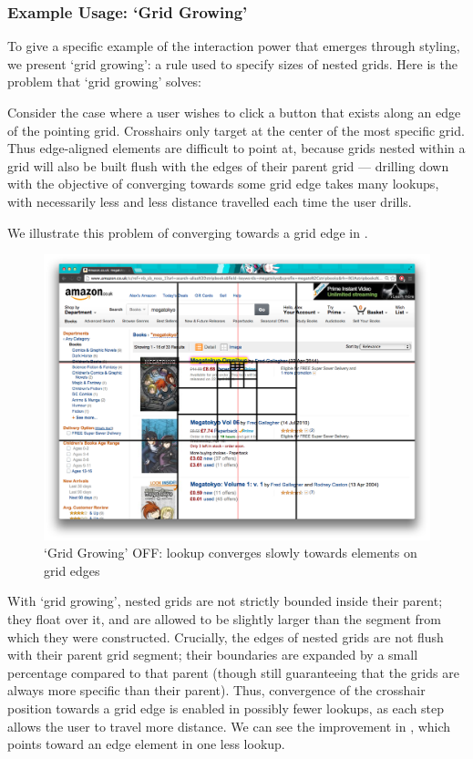 \documentclass[11pt,openright,a4paper]{report}
\begin{document}
\subsubsection{Example Usage: `Grid Growing'}
To give a specific example of the interaction power that emerges through styling, we present `grid growing': a rule used to specify sizes of nested grids. Here is the problem that `grid growing' solves:

Consider the case where a user wishes to click a button that exists along an edge of the pointing grid. Crosshairs only target at the center of the most specific grid. Thus edge-aligned elements are difficult to point at, because grids nested within a grid will also be built flush with the edges of their parent grid --- drilling down with the objective of converging towards some grid edge takes many lookups, with necessarily less and less distance travelled each time the user drills.

We illustrate this problem of converging towards a grid edge in .

\begin{figure}[ht]
\centering\includegraphics[width=\textwidth]{figures/GrowingOff.png}
\caption{`Grid Growing' OFF: lookup converges slowly towards elements on grid edges}
\label{fig:growingoff}
\end{figure}

\FloatBarrier
With `grid growing', nested grids are not strictly bounded inside their parent; they float over it, and are allowed to be slightly larger than the segment from which they were constructed. Crucially, the edges of nested grids are not flush with their parent grid segment; their boundaries are expanded by a small percentage compared to that parent (though still guaranteeing that the grids are always more specific than their parent). Thus, convergence of the crosshair position towards a grid edge is enabled in possibly fewer lookups, as each step allows the user to travel more distance. We can see the improvement in , which points toward an edge element in one less lookup.
\end{document}
